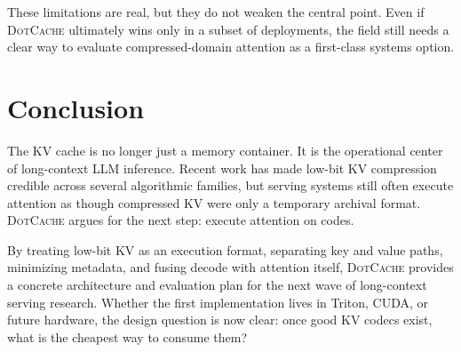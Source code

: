 \documentclass[11pt]{article}
\newcommand{\method}{\textsc{DotCache}}
\newcommand{\kv}{KV}
\begin{document}
These limitations are real, but they do not weaken the central point. Even if \method{} ultimately wins only in a subset of deployments, the field still needs a clear way to evaluate compressed-domain attention as a first-class systems option.

\section{Conclusion}

The \kv{} cache is no longer just a memory container. It is the operational center of long-context LLM inference. Recent work has made low-bit \kv{} compression credible across several algorithmic families, but serving systems still often execute attention as though compressed \kv{} were only a temporary archival format. \method{} argues for the next step: execute attention on codes.

By treating low-bit \kv{} as an execution format, separating key and value paths, minimizing metadata, and fusing decode with attention itself, \method{} provides a concrete architecture and evaluation plan for the next wave of long-context serving research. Whether the first implementation lives in Triton, CUDA, or future hardware, the design question is now clear: once good \kv{} codecs exist, what is the cheapest way to consume them?
\end{document}
